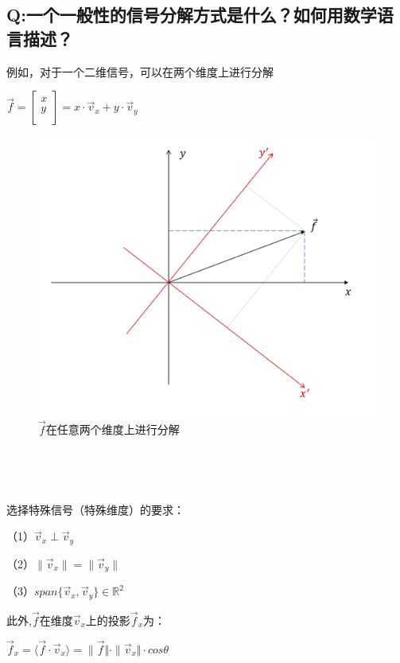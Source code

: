 \documentclass[UTF8]{ctexart}
\begin{document}
\subsection{Q:一个一般性的信号分解方式是什么？如何用数学语言描述？}
例如，对于一个二维信号，可以在两个维度上进行分解 \par
$\vec{f}= \left[   
    \begin{matrix}
    x \\
    y \\
    \end{matrix}
  \right]
  = x\cdot\vec{v}_x+y\cdot\vec{v}_y $
\begin{figure}[h]
    \centering         %
    \includegraphics[scale=0.35]{5.jpg}
    \caption{$\vec{f}$在任意两个维度上进行分解}
\end{figure}
\, \par
\, \par
选择特殊信号（特殊维度）的要求： \par
（1）$\vec{v}_x\perp \vec{v}_y$ \par
（2）$\parallel \vec{v}_x\parallel = \parallel\vec{v}_y\parallel$ \par
（3）$span\{\vec{v}_x, \vec{v}_y\}  \in \mathbb{R} ^2 $ \par
此外,$\vec{f}$在维度$\vec{v}_x$上的投影$\vec{f}_x$为：\par
$\vec{f}_x= \langle \vec{f}\cdot\vec{v}_x\rangle =\| \vec{f} \Vert \cdot  \| \vec{v}_x\Vert \cdot cos\theta  $
\end{document}
